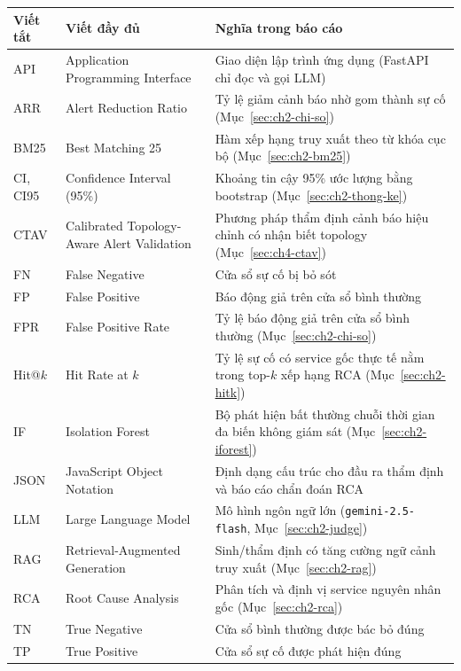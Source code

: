 \documentclass[a4paper,table]{article}
\theoremstyle{definition}
\newcommand{\tblfont}{\fontsize{10.5pt}{14.5pt}\selectfont}
\begin{document}
\begin{center}
\tblfont
\renewcommand{\arraystretch}{1.25}
\begin{tabularx}{\linewidth}{|l|>{\raggedright\arraybackslash}p{5.5cm}|Y|}
  \hline
  \textbf{Viết tắt} & \textbf{Viết đầy đủ} & \textbf{Nghĩa trong báo cáo} \\
  \hline
  API & Application Programming Interface & Giao diện lập trình ứng dụng (FastAPI chỉ đọc và gọi LLM) \\
  \hline
  ARR & Alert Reduction Ratio & Tỷ lệ giảm cảnh báo nhờ gom thành sự cố (Mục~\ref{sec:ch2-chi-so}) \\
  \hline
  BM25 & Best Matching 25 & Hàm xếp hạng truy xuất theo từ khóa cục bộ (Mục~\ref{sec:ch2-bm25}) \\
  \hline
  CI, CI95 & Confidence Interval (95\%) & Khoảng tin cậy 95\% ước lượng bằng bootstrap (Mục~\ref{sec:ch2-thong-ke}) \\
  \hline
  CTAV & Calibrated Topology-Aware Alert Validation & Phương pháp thẩm định cảnh báo hiệu chỉnh có nhận biết topology (Mục~\ref{sec:ch4-ctav}) \\
  \hline
  FN & False Negative & Cửa sổ sự cố bị bỏ sót \\
  \hline
  FP & False Positive & Báo động giả trên cửa sổ bình thường \\
  \hline
  FPR & False Positive Rate & Tỷ lệ báo động giả trên cửa sổ bình thường (Mục~\ref{sec:ch2-chi-so}) \\
  \hline
  Hit@$k$ & Hit Rate at $k$ & Tỷ lệ sự cố có service gốc thực tế nằm trong top-$k$ xếp hạng RCA (Mục~\ref{sec:ch2-hitk}) \\
  \hline
  IF & Isolation Forest & Bộ phát hiện bất thường chuỗi thời gian đa biến không giám sát (Mục~\ref{sec:ch2-iforest}) \\
  \hline
  JSON & JavaScript Object Notation & Định dạng cấu trúc cho đầu ra thẩm định và báo cáo chẩn đoán RCA \\
  \hline
  LLM & Large Language Model & Mô hình ngôn ngữ lớn (\texttt{gemini-2.5-flash}, Mục~\ref{sec:ch2-judge}) \\
  \hline
  RAG & Retrieval-Augmented Generation & Sinh/thẩm định có tăng cường ngữ cảnh truy xuất (Mục~\ref{sec:ch2-rag}) \\
  \hline
  RCA & Root Cause Analysis & Phân tích và định vị service nguyên nhân gốc (Mục~\ref{sec:ch2-rca}) \\
  \hline
  TN & True Negative & Cửa sổ bình thường được bác bỏ đúng \\
  \hline
  TP & True Positive & Cửa sổ sự cố được phát hiện đúng \\
  \hline
\end{tabularx}
\end{center}
\end{document}
